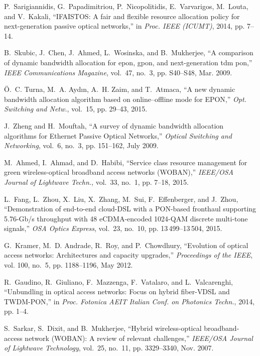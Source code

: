 \documentclass[pdftex,journal]{IEEEtran}
\begin{document}
\begin{thebibliography}{10}
P.~Sarigiannidis, G.~Papadimitriou, P.~Nicopolitidis, E.~Varvarigos, M.~Louta,
  and V.~Kakali, ``{IFAISTOS}: A fair and flexible resource allocation policy
  for next-generation passive optical networks,'' in \emph{Proc. IEEE (ICUMT)},
  2014, pp. 7--14.

B.~Skubic, J.~Chen, J.~Ahmed, L.~Wosinska, and B.~Mukherjee, ``A comparison of
  dynamic bandwidth allocation for epon, gpon, and next-generation tdm pon,''
  \emph{IEEE Communications Magazine}, vol.~47, no.~3, pp. S40--S48, Mar. 2009.

{\"O}.~C. Turna, M.~A. Ayd{\i}n, A.~H. Zaim, and T.~Atmaca, ``A new dynamic
  bandwidth allocation algorithm based on online--offline mode for {EPON},''
  \emph{Opt. Switching and Netw.}, vol.~15, pp. 29--43, 2015.

J.~Zheng and H.~Mouftah, ``A survey of dynamic bandwidth allocation algorithms
  for {Ethernet Passive Optical Networks},'' \emph{Optical Switching and
  Networking}, vol.~6, no.~3, pp. 151--162, July 2009.

M.~Ahmed, I.~Ahmad, and D.~Habibi, ``Service class resource management for
  green wireless-optical broadband access networks {(WOBAN)},'' \emph{IEEE/OSA
  Journal of Lightwave Techn.}, vol.~33, no.~1, pp. 7--18, 2015.

L.~Fang, L.~Zhou, X.~Liu, X.~Zhang, M.~Sui, F.~Effenberger, and J.~Zhou,
  ``Demonstration of end-to-end {cloud-DSL} with a {PON}-based fronthaul
  supporting {5.76-Gb/s} throughput with {48 eCDMA-encoded} {1024-QAM} discrete
  multi-tone signals,'' \emph{OSA Optics Express}, vol.~23, no.~10, pp.
  13\,499--13\,504, 2015.

G.~Kramer, M.~D. Andrade, R.~Roy, and P.~Chowdhury, ``Evolution of optical
  access networks: Architectures and capacity upgrades,'' \emph{Proceedings of
  the IEEE}, vol. 100, no.~5, pp. 1188--1196, May 2012.

R.~Gaudino, R.~Giuliano, F.~Mazzenga, F.~Vatalaro, and L.~Valcarenghi,
  ``Unbundling in optical access networks: Focus on hybrid fiber-{VDSL} and
  {TWDM-PON},'' in \emph{Proc. Fotonica AEIT Italian Conf. on Photonics
  Techn.}, 2014, pp. 1--4.

S.~Sarkar, S.~Dixit, and B.~Mukherjee, ``Hybrid wireless-optical
  broadband-access network ({WOBAN}): A review of relevant challenges,''
  \emph{IEEE/OSA Journal of Lightwave Technology}, vol.~25, no.~11, pp.
  3329--3340, Nov. 2007.


\end{thebibliography}
\end{document}
